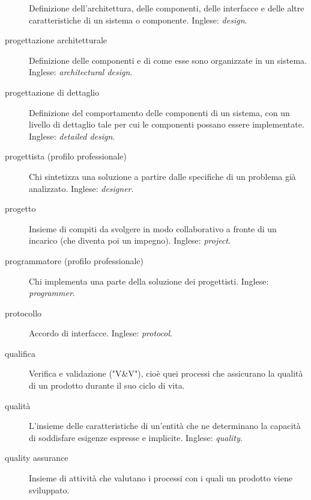 \documentclass[a4paper]{article}
\begin{document}
\begin{description}
			Definizione dell'architettura, delle componenti, delle interfacce e delle altre caratteristiche di un sistema o componente. Inglese: \emph{design}.
			
	\item[progettazione architetturale] 

			Definizione delle componenti e di come esse sono organizzate in un sistema. Inglese: \emph{architectural design}.
			
	\item[progettazione di dettaglio] 

			Definizione del comportamento delle componenti di un sistema, con un livello di dettaglio tale per cui le componenti possano essere implementate. Inglese: \emph{detailed design}.
			
	\item[progettista (profilo professionale)] 

			Chi sintetizza una soluzione a partire dalle specifiche di un problema già analizzato. Inglese: \emph{designer}.
			
	\item[progetto] 

			Insieme di compiti da svolgere in modo collaborativo a fronte di un incarico (che diventa poi un impegno). Inglese: \emph{project}.
			
	\item[programmatore (profilo professionale)] 

			Chi implementa una parte della soluzione dei progettisti. Inglese: \emph{programmer}.
			
	\item[protocollo] 

			Accordo di interfacce. Inglese: \emph{protocol}.
			
	\item[qualifica] 

			Verifica e validazione ("V\&{}V"), cioè quei processi che assicurano la qualità di un prodotto durante il suo ciclo di vita.
			
	\item[qualità] 

			L'insieme delle caratteristiche di un'entità che ne determinano la capacità di soddisfare esigenze espresse e implicite. Inglese: \emph{quality}.
			
	\item[quality assurance] 

			Insieme di attività che valutano i processi con i quali un prodotto viene sviluppato.
			

\end{description}
\end{document}

